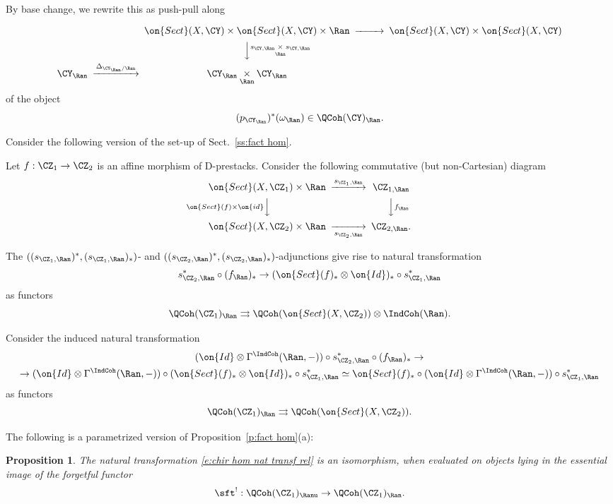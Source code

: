 \documentclass[9pt]{amsart}
\newtheorem{prop}[subsubsection]{Proposition}
\theoremstyle{remark}
\theoremstyle{definition}
\theoremstyle{remark}
\newcommand{\secref}[1]{Sect.~\ref{#1}}
\newcommand{\propref}[1]{Proposition~\ref{#1}}
\numberwithin{equation}{section}
\begin{document}
By base change, we rewrite this as push-pull along

$$
\CD
& & \on{Sect}(X,\CY)\times \on{Sect}(X,\CY)\times \Ran @>>> \on{Sect}(X,\CY)\times \on{Sect}(X,\CY) \\
& & @VV{s_{\CY,\Ran}\underset{\Ran}\times s_{\CY,\Ran}}V \\
\CY_\Ran @>{\Delta_{\CY_\Ran/\Ran}}>> \CY_\Ran\underset{\Ran}\times \CY_\Ran
\endCD
$$
of the object
$$(p_{\CY_\Ran})^*(\omega_\Ran)\in \QCoh(\CY)_\Ran.$$

\sssec{}

Consider the following version of the set-up of \secref{ss:fact hom}. 

\medskip

Let $f:\CZ_1\to \CZ_2$ is an affine morphism of D-prestacks. 
Consider the following commutative (but non-Cartesian) diagram
$$
\CD
\on{Sect}(X,\CZ_1)\times \Ran @>{s_{\CZ_1,\Ran}}>> \CZ_{1,\Ran} \\
@V{\on{Sect}(f)\times \on{id}}VV @VV{f_\Ran}V \\
\on{Sect}(X,\CZ_2)\times \Ran @>>{s_{\CZ_2,\Ran}}> \CZ_{2,\Ran}.
\endCD
$$

The $((s_{\CZ_1,\Ran})^*,(s_{\CZ_1,\Ran})_*)$- and $((s_{\CZ_2,\Ran})^*,(s_{\CZ_2,\Ran})_*)$-adjunctions give
rise to natural transformation 
$$s_{\CZ_2,\Ran}^*\circ (f_\Ran)_*\to (\on{Sect}(f)_*\otimes \on{Id})_*\circ s_{\CZ_1,\Ran}^*$$
as functors
$$\QCoh(\CZ_1)_\Ran\rightrightarrows  \QCoh(\on{Sect}(X,\CZ_2))\otimes \IndCoh(\Ran).$$

\medskip

Consider the induced natural transformation
\begin{multline} \label{e:chir hom nat transf rel}
(\on{Id}\otimes \Gamma^{\IndCoh}(\Ran,-))\circ s_{\CZ_2,\Ran}^*\circ (f_\Ran)_*\to \\
\to (\on{Id}\otimes \Gamma^{\IndCoh}(\Ran,-))\circ (\on{Sect}(f)_*\otimes \on{Id})_*\circ s_{\CZ_1,\Ran}^*\simeq
\on{Sect}(f)_* \circ (\on{Id}\otimes \Gamma^{\IndCoh}(\Ran,-))\circ s_{\CZ_1,\Ran}^*
\end{multline}
as functors
$$\QCoh(\CZ_1)_\Ran\rightrightarrows  \QCoh(\on{Sect}(X,\CZ_2)).$$

\medskip

The following is a parametrized version of \propref{p:fact hom}(a): 

\begin{prop} \label{p:fact hom rel}
The natural transformation \eqref{e:chir hom nat transf rel} is an isomorphism, when evaluated on objects lying
in the essential image of the forgetful functor
$$\sft^!:\QCoh(\CZ_1)_\Ranu\to \QCoh(\CZ_1)_\Ran.$$
\end{prop}
\end{document}
